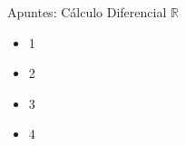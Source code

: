 Apuntes: Cálculo Diferencial 
\lipsum[2]
$\mathbb{R}$

    

\begin{itemize}
    \item 1
    \item 2
    \item 3
    \item 4
\end{itemize}
